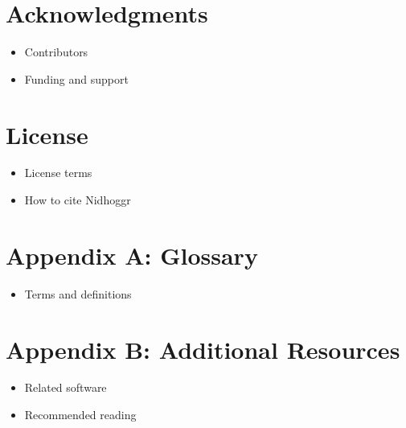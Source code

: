 \documentclass[12pt]{article}
\begin{document}
\newpage
	
	\section{Acknowledgments}
	\begin{itemize}
		\item Contributors
		\item Funding and support
	\end{itemize}
	
	\section{License}
	\begin{itemize}
		\item License terms
		\item How to cite Nidhoggr
	\end{itemize}

\newpage
	
	\appendix
	
	\section{Appendix A: Glossary}
	\begin{itemize}
		\item Terms and definitions
	\end{itemize}
	
	\section{Appendix B: Additional Resources}
	\begin{itemize}
		\item Related software
		\item Recommended reading
	\end{itemize}
	
\end{document}
